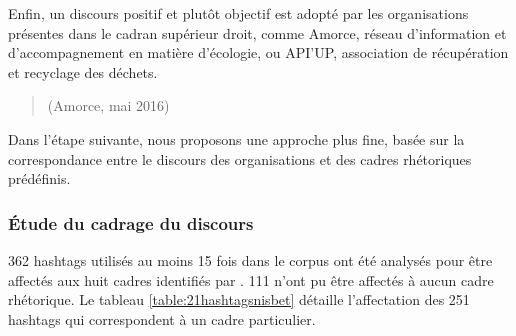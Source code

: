             Enfin, un discours positif et plutôt objectif est adopté par les organisations présentes dans le cadran supérieur droit, comme Amorce, réseau d'information et d'accompagnement en matière d'écologie, ou API'UP, association de récupération et recyclage des déchets.

            \begin{quotation}
                (Amorce, mai 2016) \\
            \end{quotation}

            Dans l'étape suivante, nous proposons une approche plus fine, basée sur la correspondance entre le discours des organisations et des cadres rhétoriques prédéfinis.


        \subsubsection{Étude du cadrage du discours}

            362 hashtags utilisés au moins 15 fois dans le corpus ont été analysés pour être affectés aux huit cadres identifiés par \textcite{nisbet2009communicating}. 111 n’ont pu être affectés à aucun cadre rhétorique. Le tableau \ref{table:21hashtagsnisbet} détaille l’affectation des 251 hashtags qui correspondent à un cadre particulier.\\

